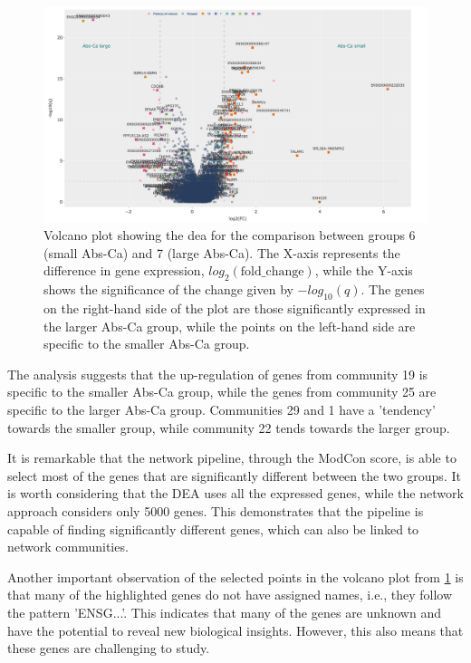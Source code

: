 \begin{figure}[!b]    
    \centering
    \includegraphics[width=1.0\textwidth,height=1.0\textheight,keepaspectratio]{Sections/Network_II/resources/non_tum/diff_split_dea.png}
    \caption{Volcano plot showing the \acrfull{dea} for the comparison between groups 6 (small Abs-Ca) and 7 (large Abs-Ca). The X-axis represents the difference in gene expression, $log_2(\text{fold\_change})$, while the Y-axis shows the significance of the change given by $-log_{10}(q)$. The genes on the right-hand side of the plot are those significantly expressed in the larger Abs-Ca group, while the points on the left-hand side are specific to the smaller Abs-Ca group.}
    \label{fig:N_II:diff_split}
\end{figure}

The analysis suggests that the up-regulation of genes from community 19 is specific to the smaller Abs-Ca group, while the genes from community 25 are specific to the larger Abs-Ca group. Communities 29 and 1 have a 'tendency' towards the smaller group, while community 22 tends towards the larger group.

It is remarkable that the network pipeline, through the ModCon score, is able to select most of the genes that are significantly different between the two groups. It is worth considering that the DEA uses all the expressed genes, while the network approach considers only 5000 genes. This demonstrates that the pipeline is capable of finding significantly different genes, which can also be linked to network communities.

Another important observation of the selected points in the volcano plot from \cref{fig:N_II:diff_split} is that many of the highlighted genes do not have assigned names, i.e., they follow the pattern 'ENSG...'. This indicates that many of the genes are unknown and have the potential to reveal new biological insights. However, this also means that these genes are challenging to study.



